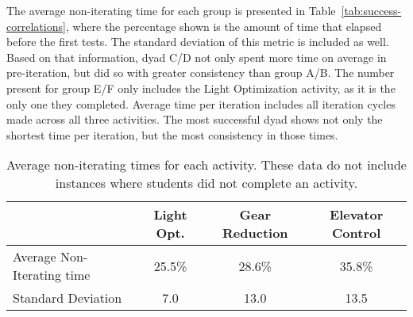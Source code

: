 The average non-iterating time for each group is presented in Table~\ref{tab:success-correlations}, where the percentage shown is the amount of time that elapsed before the first tests. The standard deviation of this metric is included as well. Based on that information, dyad C/D not only spent more time on average in pre-iteration, but did so with greater consistency than group A/B. The number present for group E/F only includes the Light Optimization activity, as it is the only one they completed. Average time per iteration includes all iteration cycles made across all three activities. The most successful dyad shows not only the shortest time per iteration, but the most consistency in those times.


\begin{table}
\begin{centering}
\begin{tabular}{l c c c}
	\toprule
							& Light Opt.	& Gear Reduction	& Elevator Control	\\ \midrule
	Average Non-Iterating time 	& 25.5\%	& 28.6\%	& 35.8\% 	\\ \midrule
	Standard Deviation 			& 7.0 & 13.0 & 13.5 \\ 
	\bottomrule
\end{tabular}
\caption[Average non-iterating times for each activity.]{Average non-iterating times for each activity. These data do not include instances where students did not complete an activity.}
\label{tab:average-intro-times}
\end{centering}
\end{table}

